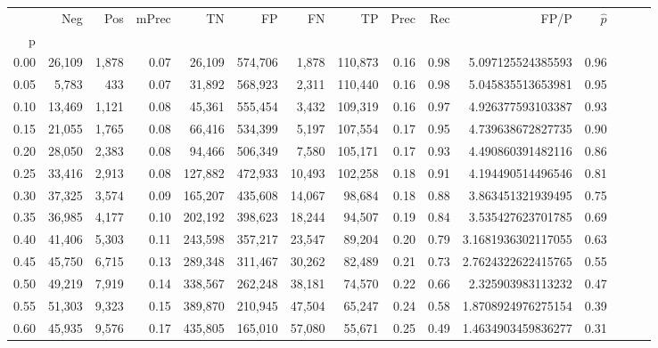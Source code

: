 \begin{tabular}{rrrrrrrrrrrrrrr}
\toprule
{} &     Neg &    Pos & mPrec &       TN &       FP &       FN &       TP &  Prec &   Rec &                 FP/P & $\hat{p}$ \\
p    &         &        &       &          &          &          &          &       &       &                      &           \\
\midrule
0.00 &  26,109 &  1,878 &  0.07 &   26,109 &  574,706 &    1,878 &  110,873 &  0.16 &  0.98 &    5.097125524385593 &      0.96 \\
0.05 &   5,783 &    433 &  0.07 &   31,892 &  568,923 &    2,311 &  110,440 &  0.16 &  0.98 &    5.045835513653981 &      0.95 \\
0.10 &  13,469 &  1,121 &  0.08 &   45,361 &  555,454 &    3,432 &  109,319 &  0.16 &  0.97 &    4.926377593103387 &      0.93 \\
0.15 &  21,055 &  1,765 &  0.08 &   66,416 &  534,399 &    5,197 &  107,554 &  0.17 &  0.95 &    4.739638672827735 &      0.90 \\
0.20 &  28,050 &  2,383 &  0.08 &   94,466 &  506,349 &    7,580 &  105,171 &  0.17 &  0.93 &    4.490860391482116 &      0.86 \\
0.25 &  33,416 &  2,913 &  0.08 &  127,882 &  472,933 &   10,493 &  102,258 &  0.18 &  0.91 &    4.194490514496546 &      0.81 \\
0.30 &  37,325 &  3,574 &  0.09 &  165,207 &  435,608 &   14,067 &   98,684 &  0.18 &  0.88 &    3.863451321939495 &      0.75 \\
0.35 &  36,985 &  4,177 &  0.10 &  202,192 &  398,623 &   18,244 &   94,507 &  0.19 &  0.84 &    3.535427623701785 &      0.69 \\
0.40 &  41,406 &  5,303 &  0.11 &  243,598 &  357,217 &   23,547 &   89,204 &  0.20 &  0.79 &   3.1681936302117055 &      0.63 \\
0.45 &  45,750 &  6,715 &  0.13 &  289,348 &  311,467 &   30,262 &   82,489 &  0.21 &  0.73 &   2.7624322622415765 &      0.55 \\
0.50 &  49,219 &  7,919 &  0.14 &  338,567 &  262,248 &   38,181 &   74,570 &  0.22 &  0.66 &    2.325903983113232 &      0.47 \\
0.55 &  51,303 &  9,323 &  0.15 &  389,870 &  210,945 &   47,504 &   65,247 &  0.24 &  0.58 &   1.8708924976275154 &      0.39 \\
0.60 &  45,935 &  9,576 &  0.17 &  435,805 &  165,010 &   57,080 &   55,671 &  0.25 &  0.49 &   1.4634903459836277 &      0.31 \\

\end{tabular}
